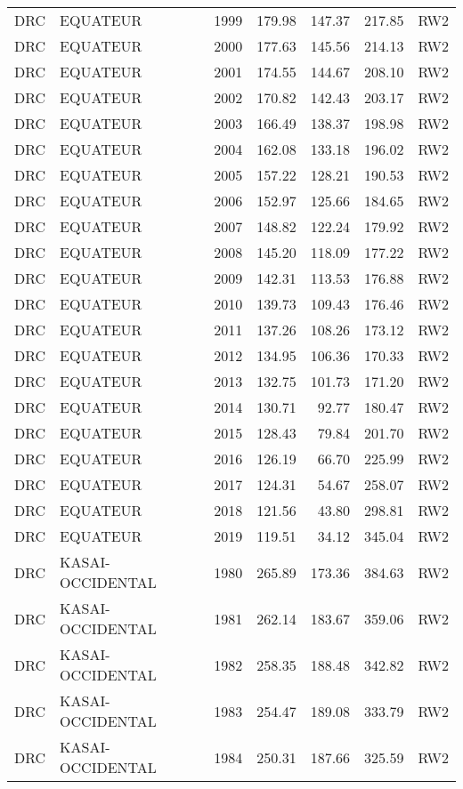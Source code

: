 \begin{longtable}{lllrrrl}
  DRC & EQUATEUR & 1999 & 179.98 & 147.37 & 217.85 & RW2 \\ 
  DRC & EQUATEUR & 2000 & 177.63 & 145.56 & 214.13 & RW2 \\ 
  DRC & EQUATEUR & 2001 & 174.55 & 144.67 & 208.10 & RW2 \\ 
  DRC & EQUATEUR & 2002 & 170.82 & 142.43 & 203.17 & RW2 \\ 
  DRC & EQUATEUR & 2003 & 166.49 & 138.37 & 198.98 & RW2 \\ 
  DRC & EQUATEUR & 2004 & 162.08 & 133.18 & 196.02 & RW2 \\ 
  DRC & EQUATEUR & 2005 & 157.22 & 128.21 & 190.53 & RW2 \\ 
  DRC & EQUATEUR & 2006 & 152.97 & 125.66 & 184.65 & RW2 \\ 
  DRC & EQUATEUR & 2007 & 148.82 & 122.24 & 179.92 & RW2 \\ 
  DRC & EQUATEUR & 2008 & 145.20 & 118.09 & 177.22 & RW2 \\ 
  DRC & EQUATEUR & 2009 & 142.31 & 113.53 & 176.88 & RW2 \\ 
  DRC & EQUATEUR & 2010 & 139.73 & 109.43 & 176.46 & RW2 \\ 
  DRC & EQUATEUR & 2011 & 137.26 & 108.26 & 173.12 & RW2 \\ 
  DRC & EQUATEUR & 2012 & 134.95 & 106.36 & 170.33 & RW2 \\ 
  DRC & EQUATEUR & 2013 & 132.75 & 101.73 & 171.20 & RW2 \\ 
  DRC & EQUATEUR & 2014 & 130.71 & 92.77 & 180.47 & RW2 \\ 
  DRC & EQUATEUR & 2015 & 128.43 & 79.84 & 201.70 & RW2 \\ 
  DRC & EQUATEUR & 2016 & 126.19 & 66.70 & 225.99 & RW2 \\ 
  DRC & EQUATEUR & 2017 & 124.31 & 54.67 & 258.07 & RW2 \\ 
  DRC & EQUATEUR & 2018 & 121.56 & 43.80 & 298.81 & RW2 \\ 
  DRC & EQUATEUR & 2019 & 119.51 & 34.12 & 345.04 & RW2 \\ 
  DRC & KASAI-OCCIDENTAL & 1980 & 265.89 & 173.36 & 384.63 & RW2 \\ 
  DRC & KASAI-OCCIDENTAL & 1981 & 262.14 & 183.67 & 359.06 & RW2 \\ 
  DRC & KASAI-OCCIDENTAL & 1982 & 258.35 & 188.48 & 342.82 & RW2 \\ 
  DRC & KASAI-OCCIDENTAL & 1983 & 254.47 & 189.08 & 333.79 & RW2 \\ 
  DRC & KASAI-OCCIDENTAL & 1984 & 250.31 & 187.66 & 325.59 & RW2 \\ 

\end{longtable}
